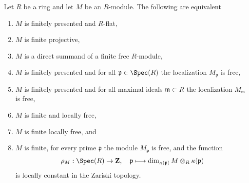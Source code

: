\begin{lemma}
\label{lemma-finite-projective}
Let $R$ be a ring and let $M$ be an $R$-module.
The following are equivalent
\begin{enumerate}
\item $M$ is finitely presented and $R$-flat,
\item $M$ is finite projective,
\item $M$ is a direct summand of a finite free $R$-module,
\item $M$ is finitely presented and
for all $\mathfrak p \in \Spec(R)$ the
localization $M_{\mathfrak p}$ is free,
\item $M$ is finitely presented and
for all maximal ideals $\mathfrak m \subset R$ the
localization $M_{\mathfrak m}$ is free,
\item $M$ is finite and locally free,
\item $M$ is finite locally free, and
\item $M$ is finite, for every prime $\mathfrak p$ the module
$M_{\mathfrak p}$ is free, and the function
$$
\rho_M : \Spec(R) \to \mathbf{Z}, \quad
\mathfrak p
\longmapsto
\dim_{\kappa(\mathfrak p)} M \otimes_R \kappa(\mathfrak p)
$$
is locally constant in the Zariski topology.
\end{enumerate}
\end{lemma}

